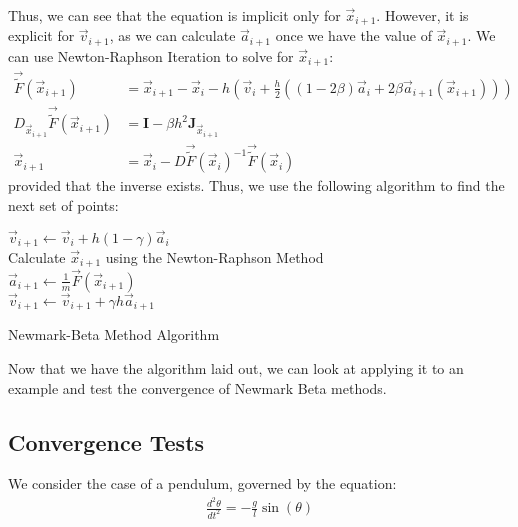 \documentclass[../Main.tex]{subfiles}
\begin{document}
Thus, we can see that the equation is implicit only for $\vec{x}_{i+1}$. However, it is explicit for $\vec{v}_{i+1}$, as we can calculate $\vec{a}_{i+1}$ once we have the value of $\vec{x}_{i+1}$.  We can use Newton-Raphson Iteration to solve for $\vec{x}_{i+1}$:
\begin{align}
	\vec{\tilde{F}}\left(\vec{x}_{i+1}\right) & = \vec{x}_{i+1} - \vec{x}_{i} -h\left(\vec{v}_{i} + \frac{h}{2}\left(\left(1-2\beta\right)\vec{a}_{i} + 2\beta\vec{a}_{i+1}\left(\vec{x}_{i+1}\right)\right)\right) \nonumber \\
	D_{\vec{x}_{i+1}}\vec{\tilde{F}}\left(\vec{x}_{i+1}\right) & = \textbf{I} -  \beta h^{2}\textbf{J}_{\vec{x}_{i+1}} \nonumber \\
	\vec{x}_{i+1} & = \vec{x}_{i} - D\vec{\tilde{F}}\left(\vec{x}_{i}\right)^{-1}\vec{\tilde{F}}\left(\vec{x}_{i}\right) \label{eqn:newton-raphson_final_step}
\end{align}
provided that the inverse exists. Thus, we use the following algorithm to find the next set of points: \\
\begin{algorithm}[H]
\SetAlgoLined
{}

\BlankLine

$\vec{v}_{i+1} \leftarrow \vec{v}_{i} + h\left(1-\gamma\right)\vec{a}_{i}$\\
Calculate $\vec{x}_{i+1}$ using the Newton-Raphson Method \\
$\vec{a}_{i+1} \leftarrow \frac{1}{m}\vec{F}\left(\vec{x}_{i+1}\right)$\\
$\vec{v}_{i+1} \leftarrow \vec{v}_{i+1} + \gamma h\vec{a}_{i+1}$ 
\caption{Newmark-Beta Method Algorithm}
\label{algorithm:newmark-beta}
\end{algorithm}
\BlankLine
Now that we have the algorithm laid out, we can look at applying it to an example and test the convergence of Newmark Beta methods.

\subsection{Convergence Tests}

We consider the case of a pendulum, governed by the equation:
\begin{align}
\frac{d^2\theta}{dt^2} = -\frac{g}{l}\sin(\theta)
\end{align}
\end{document}
